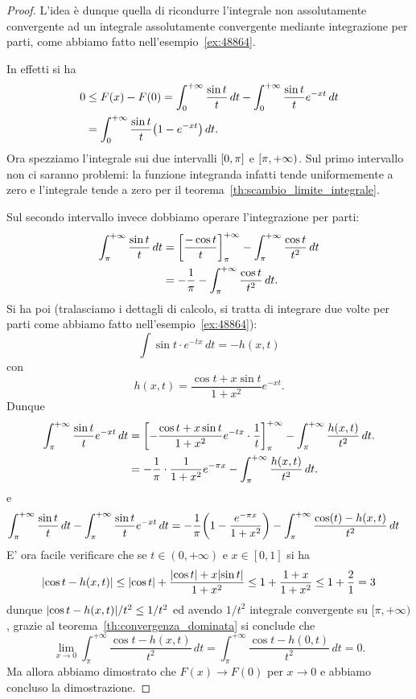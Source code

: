 \begin{proof}
L'idea è dunque quella di ricondurre l'integrale non assolutamente convergente 
ad un integrale assolutamente convergente mediante integrazione per parti, 
come abbiamo fatto nell'esempio~\ref{ex:48864}.

In effetti si ha 
\begin{align*}
 0 
 & \le F(x) - F(0) 
 = \int_0^{+\infty} \frac{\sin t}{t}\, dt  - \int_0^{+\infty} \frac{\sin t}{t}e^{-xt}\, dt \\
 & = \int_0^{+\infty} \frac{\sin t}{t}{\left( 1-e^{-xt} \right)}\, dt.
\end{align*}
Ora spezziamo l'integrale sui due intervalli $\left[0,\pi\right]$ 
e $\left[\pi,+\infty\right)$.
Sul primo intervallo non ci saranno problemi: la funzione integranda 
infatti tende uniformemente a zero e l'integrale tende a zero 
per il teorema~\ref{th:scambio_limite_integrale}.

Sul secondo intervallo invece dobbiamo operare l'integrazione per parti:
\begin{align*}
  \int_\pi^{+\infty} \frac{\sin t}{t}\, dt 
  &= {\left[ \frac{-\cos t}{t} \right]}_{\pi}^{+\infty}
    - \int_{\pi}^{+\infty} \frac{\cos t}{t^2}\, dt \\
  &= -\frac{1}{\pi} - \int_{\pi}^{+\infty} \frac {\cos t}{t^2}\, dt.\\
\end{align*}
Si ha poi (tralasciamo i dettagli di calcolo, 
si tratta di integrare due volte per parti come 
abbiamo fatto nell'esempio~\ref{ex:48864}):
\[
\int \sin t\cdot e^{-tx}\, dt 
= -h(x,t)
\]
con 
\[
h(x,t)= \frac{\cos t+x\sin t}{1+x^2}e^{-xt}.  
\]
Dunque 
\begin{align*}
  \int_\pi^{+\infty} \frac{\sin t}{t} e^{-xt}\, dt 
  &= {\left[ -\frac{\cos t+ x \sin t}{1+x^2}e^{-tx}\cdot \frac{1}{t} \right]}_{\pi}^{+\infty} 
  - \int_\pi^{+\infty}\frac{h(x,t)}{t^2}\, dt.\\  
  &= -\frac 1 \pi\cdot \frac{1}{1+x^2}e^{-\pi x} - \int_\pi^{+\infty}\frac{h(x,t)}{t^2}\, dt.
\end{align*}
e
\begin{align*}
\int_\pi^{+\infty} \frac{\sin t}{t}\, dt 
-\int_\pi^{+\infty} \frac{\sin t}{t} e^{-xt}\, dt
&= -\frac 1 \pi {\left( 1-\frac{e^{-\pi x}}{1+x^2} \right)}
-\int_\pi^{+\infty} \frac{\cos(t) - h(x,t)}{t^2}\, dt 
\end{align*}
E' ora facile verificare che se $t\in(0,+\infty)$
e $x\in[0,1]$ si ha 
\[
{\left|\cos t - h(x,t)\right|} \le {\left|\cos t\right|} + \frac{{\left|\cos t\right|}+x{\left|\sin t\right|}}{1+x^2}
\le 1+ \frac{1+x}{1+x^2} \le 1 + \frac 2 1 = 3
\]
dunque ${\left|\cos t - h(x,t)\right|}/t^2 \le 1/t^2$ ed avendo $1/t^2$ 
integrale convergente su $[\pi,+\infty)$, grazie 
al teorema~\ref{th:convergenza_dominata} si conclude 
che 
\[
\lim_{x\to 0} \int_\pi^{+\infty} \frac{\cos t - h(x,t)}{t^2}\, dt 
= \int_{\pi}^{+\infty} \frac{\cos t - h(0,t)}{t^2}\, dt 
= 0.  
\]
Ma allora abbiamo dimostrato che $F(x)\to F(0)$ per $x\to 0$ 
e abbiamo concluso la dimostrazione.
\end{proof}

